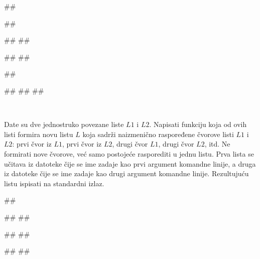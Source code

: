 \begin{Exercise}[difficulty=1, label=4_06]
\begin{miditest}
\begin{test}{3}
##

##

##
##

#\naslovIzlaz#
#\izlaz{[5, 6, 11, 12, 14, 16]}#
\end{test}
\end{miditest}
\begin{miditest}
\begin{test}{4}
##

#\naslovIzlazZaGresku# 
## 
##
\end{test}
\end{miditest}

\end{Exercise}
\begin{Answer}[ref=4_06]
\\
\end{Answer}

\begin{Exercise}[difficulty=1,label=4_07]
Date su dve jednostruko povezane liste $L1$ i $L2$. Napisati funkciju koja od 
ovih listi formira novu listu $L$ koja sadrži naizmenično raspoređene čvorove 
listi $L1$ i $L2$: prvi čvor iz $L1$, prvi čvor iz $L2$, drugi čvor $L1$,
drugi čvor $L2$, itd. Ne formirati nove čvorove, već samo postojeće rasporediti u jednu listu. Prva lista se učitava iz datoteke čije se ime zadaje kao prvi argument komandne linije, a druga iz datoteke čije se ime zadaje kao 
drugi argument komandne linije. Rezultujuću listu ispisati na standardni izlaz.\\

\begin{miditest}
\begin{test}{1}
##

##
##

##
##

#\naslovIzlaz#
##
\end{test}
\end{miditest}
\end{Exercise}

